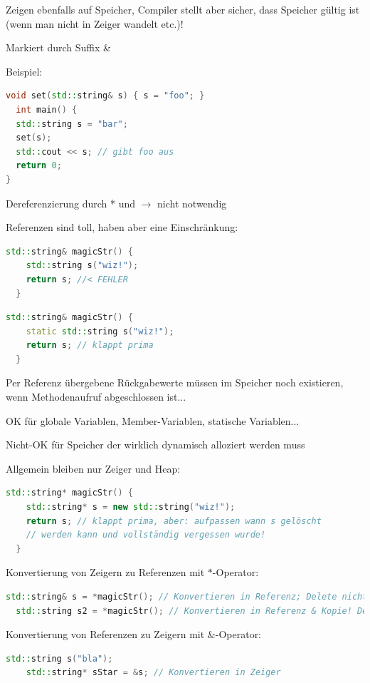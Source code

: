 \documentclass[10pt]{article}
\begin{document}
\begin{itemize*}
  \item Zeigen ebenfalls auf Speicher, Compiler stellt aber sicher, dass Speicher gültig ist (wenn man nicht in Zeiger wandelt etc.)!
  \item Markiert durch Suffix \&
  \item Beispiel:
  \begin{lstlisting}[language=C++]
void set(std::string& s) { s = "foo"; }
  int main() {
  std::string s = "bar";
  set(s);
  std::cout << s; // gibt foo aus
  return 0;
}
\end{lstlisting}
  \item Dereferenzierung durch * und $\rightarrow$ nicht notwendig
  \item Referenzen sind toll, haben aber eine Einschränkung:
  \begin{lstlisting}[language=C++]
  std::string& magicStr() {
    std::string s("wiz!");
    return s; //< FEHLER
  }
  \end{lstlisting}
  \begin{lstlisting}[language=C++]
  std::string& magicStr() {
    static std::string s("wiz!");
    return s; // klappt prima
  }
\end{lstlisting}
  \item Per Referenz übergebene Rückgabewerte müssen im Speicher noch existieren, wenn Methodenaufruf abgeschlossen ist...
  \begin{itemize*}
    \item OK für globale Variablen, Member-Variablen, statische Variablen...
    \item Nicht-OK für Speicher der wirklich dynamisch alloziert werden muss
  \end{itemize*}
  \item Allgemein bleiben nur Zeiger und Heap:
  \begin{lstlisting}[language=C++]
  std::string* magicStr() {
    std::string* s = new std::string("wiz!");
    return s; // klappt prima, aber: aufpassen wann s gelöscht
    // werden kann und vollständig vergessen wurde!
  }
  \end{lstlisting}
  \item Konvertierung von Zeigern zu Referenzen mit $*$-Operator:
  \begin{lstlisting}[language=C++]
  std::string& s = *magicStr(); // Konvertieren in Referenz; Delete nicht mehr möglich
  std::string s2 = *magicStr(); // Konvertieren in Referenz & Kopie! Delete nicht direkt möglich
  \end{lstlisting}
  \item Konvertierung von Referenzen zu Zeigern mit $\&$-Operator:
  \begin{lstlisting}[language=C++]
    std::string s("bla");
    std::string* sStar = &s; // Konvertieren in Zeiger
  \end{lstlisting}
\end{itemize*}
\end{document}
